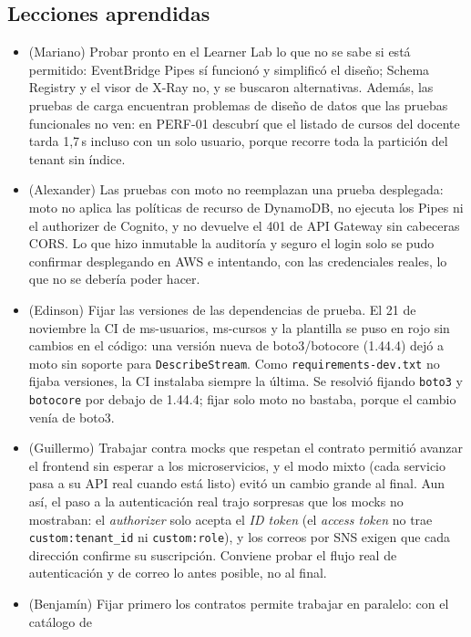 \subsection{Lecciones aprendidas}
\begin{itemize}
  \item (Mariano) Probar pronto en el Learner Lab lo que no se sabe si está permitido: EventBridge
        Pipes sí funcionó y simplificó el diseño; Schema Registry y el visor de X-Ray no, y se buscaron
        alternativas. Además, las pruebas de carga encuentran problemas de diseño de datos que las
        pruebas funcionales no ven: en PERF-01 descubrí que el listado de cursos del docente tarda
        1{,}7\,s incluso con un solo usuario, porque recorre toda la partición del tenant sin índice.
  \item (Alexander) Las pruebas con moto no reemplazan una prueba desplegada: moto no aplica las
        políticas de recurso de DynamoDB, no ejecuta los Pipes ni el authorizer de Cognito, y no
        devuelve el 401 de API Gateway sin cabeceras CORS. Lo que hizo inmutable la auditoría y seguro
        el login solo se pudo confirmar desplegando en AWS e intentando, con las credenciales reales,
        lo que no se debería poder hacer.
  \item (Edinson) Fijar las versiones de las dependencias de prueba. El 21 de noviembre la CI de
        ms-usuarios, ms-cursos y la plantilla se puso en rojo sin cambios en el código: una versión
        nueva de boto3/botocore (1.44.4) dejó a moto sin soporte para \texttt{DescribeStream}. Como
        \texttt{requirements-dev.txt} no fijaba versiones, la CI instalaba siempre la última. Se
        resolvió fijando \texttt{boto3} y \texttt{botocore} por debajo de 1.44.4; fijar solo moto no
        bastaba, porque el cambio venía de boto3.
  \item (Guillermo) Trabajar contra mocks que respetan el contrato permitió avanzar el frontend sin
        esperar a los microservicios, y el modo mixto (cada servicio pasa a su API real cuando está
        listo) evitó un cambio grande al final. Aun así, el paso a la autenticación real trajo
        sorpresas que los mocks no mostraban: el \textit{authorizer} solo acepta el \textit{ID token}
        (el \textit{access token} no trae \texttt{custom:tenant\_id} ni \texttt{custom:role}), y los
        correos por SNS exigen que cada dirección confirme su suscripción. Conviene probar el flujo
        real de autenticación y de correo lo antes posible, no al final.
  \item (Benjamín) Fijar primero los contratos permite trabajar en paralelo: con el catálogo de

\end{itemize}
